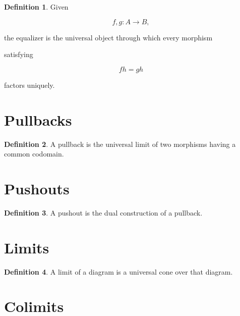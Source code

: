 \documentclass[11pt]{book}
\numberwithin{equation}{chapter}
\theoremstyle{definition}
\newtheorem{definition}{Definition}[chapter]
\theoremstyle{plain}
\begin{document}
\begin{definition}

Given

\[
f,g:A\rightarrow B,
\]

the equalizer is the universal object through which every morphism

satisfying

\[
fh=gh
\]

factors uniquely.

\end{definition}


\section{Pullbacks}

\begin{definition}

A pullback is the universal limit of two morphisms having a common
codomain.

\end{definition}


\section{Pushouts}

\begin{definition}

A pushout is the dual construction of a pullback.

\end{definition}


\section{Limits}

\begin{definition}

A limit of a diagram is a universal cone over that diagram.

\end{definition}


\section{Colimits}
\end{document}
